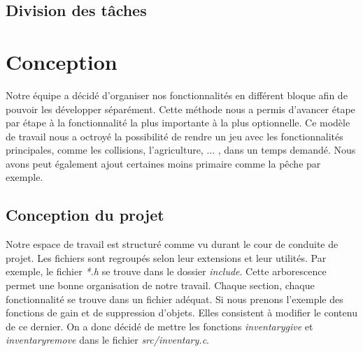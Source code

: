 \documentclass{article}
\begin{document}
\subsection{Division des tâches}
\section{Conception}
    Notre équipe a décidé d'organiser nos fonctionnalités en différent bloque afin de pouvoir les développer séparément. Cette méthode nous a permis d'avancer étape par étape à la fonctionnalité la plus importante à la plus optionnelle. Ce modèle de travail nous a octroyé la possibilité de rendre un jeu avec les fonctionnalités principales, comme les collisions, l'agriculture, ... , dans un temps demandé. Nous avons peut également ajout certaines moins primaire comme la pêche par exemple.
    
\subsection{Conception du projet}

 Notre espace de travail est structuré comme vu durant le cour de conduite de projet. Les fichiers sont regroupés selon leur extensions et leur utilités. Par exemple, le fichier \textit{*.h} se trouve dans le dossier \textit{include}. Cette arborescence permet une bonne organisation de notre travail. Chaque section, chaque fonctionnalité se trouve dans un fichier adéquat. Si nous prenons l'exemple des fonctions de gain et de suppression d'objets. Elles consistent à modifier le contenu de ce dernier. On a donc décidé de mettre les fonctions \textit{inventary\textunderscore give} et \textit{inventary\textunderscore remove} dans le fichier \textit{src/inventary.c}.
\end{document}
